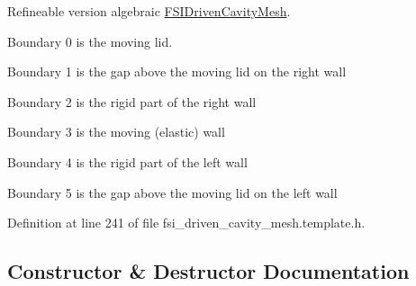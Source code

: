 Refineable version algebraic \hyperlink{classoomph_1_1FSIDrivenCavityMesh}{F\+S\+I\+Driven\+Cavity\+Mesh}.
\begin{DoxyItemize}
\item Boundary 0 is the moving lid.
\item Boundary 1 is the gap above the moving lid on the right wall
\item Boundary 2 is the rigid part of the right wall
\item Boundary 3 is the moving (elastic) wall
\item Boundary 4 is the rigid part of the left wall
\item Boundary 5 is the gap above the moving lid on the left wall 
\end{DoxyItemize}

Definition at line 241 of file fsi\+\_\+driven\+\_\+cavity\+\_\+mesh.\+template.\+h.



\subsection{Constructor \& Destructor Documentation}
\mbox{\label{classoomph_1_1RefineableAlgebraicFSIDrivenCavityMesh_a123b12382b582eb20dd2749d9f85cd8c}} 

